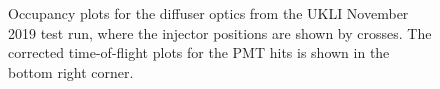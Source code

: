 \begin{figure}
    \centering
    
    \caption{Occupancy plots for the diffuser optics from the UKLI November 2019 test run, where the injector positions are shown by crosses. The corrected time-of-flight plots for the PMT hits is shown in the bottom right corner.} \label{fig:occupancy_diffuser} 
    
     \hfill
     \par
     \hfill

\end{figure}

